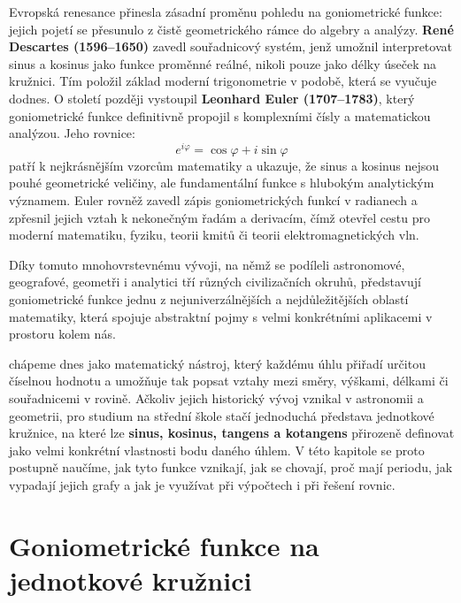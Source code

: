 \documentclass[12pt,a4paper]{article}
\begin{document}
\begin{historicalbox}
Evropská renesance přinesla zásadní proměnu pohledu na goniometrické funkce: jejich pojetí 
se přesunulo z čistě geometrického rámce do algebry a analýzy. \textbf{René Descartes (1596–1650)} 
zavedl souřadnicový systém, jenž umožnil interpretovat sinus a kosinus jako funkce proměnné 
reálné, nikoli pouze jako délky úseček na kružnici. Tím položil základ moderní trigonometrie 
v podobě, která se vyučuje dodnes. O století později vystoupil \textbf{Leonhard Euler (1707–1783)}, 
který goniometrické funkce definitivně propojil s komplexními čísly a matematickou analýzou. 
Jeho rovnice:
\[
e^{i\varphi} = \cos\varphi + i\sin\varphi
\]
patří k nejkrásnějším vzorcům matematiky a ukazuje, že sinus a kosinus nejsou pouhé geometrické 
veličiny, ale fundamentální funkce s hlubokým analytickým významem. Euler rovněž zavedl 
zápis goniometrických funkcí v radianech a zpřesnil jejich vztah k nekonečným řadám a derivacím, 
čímž otevřel cestu pro moderní matematiku, fyziku, teorii kmitů či teorii elektromagnetických 
vln.

Díky tomuto mnohovrstevnému vývoji, na němž se podíleli astronomové, geografové, 
geometři i analytici tří různých civilizačních okruhů, představují goniometrické funkce
jednu z nejuniverzálnějších a nejdůležitějších oblastí matematiky, která spojuje abstraktní 
pojmy s velmi konkrétními aplikacemi v prostoru kolem nás.
\end{historicalbox}


 chápeme dnes jako matematický nástroj, který každému úhlu přiřadí 
určitou číselnou hodnotu a umožňuje tak popsat vztahy mezi směry, výškami, délkami či 
souřadnicemi v rovině. Ačkoliv jejich historický vývoj vznikal v astronomii a geometrii, 
pro studium na střední škole stačí jednoduchá představa jednotkové kružnice, na které lze 
\textbf{sinus, kosinus, tangens a kotangens} přirozeně definovat jako velmi konkrétní vlastnosti bodu 
daného úhlem. V této kapitole se proto postupně naučíme, jak tyto funkce vznikají, jak se 
chovají, proč mají periodu, jak vypadají jejich grafy a jak je využívat při výpočtech i při 
řešení rovnic.



\section{Goniometrické funkce na jednotkové kružnici}
\end{document}
